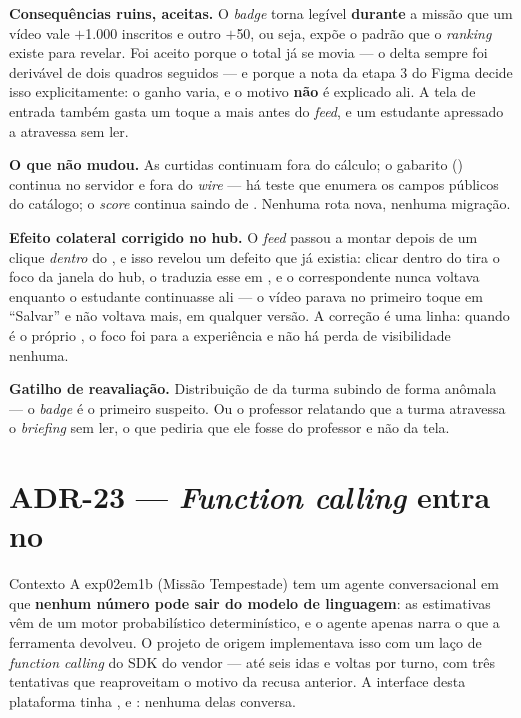 \textbf{Consequências ruins, aceitas.} O \emph{badge} torna legível
\textbf{durante} a missão que um vídeo vale $+$1.000 inscritos e outro $+$50, ou
seja, expõe o padrão que o \emph{ranking} existe para revelar. Foi aceito porque
o total já se movia --- o delta sempre foi derivável de dois quadros seguidos ---
e porque a nota da etapa 3 do Figma decide isso explicitamente: o ganho varia, e
o motivo \textbf{não} é explicado ali. A tela de entrada também gasta um toque a
mais antes do \emph{feed}, e um estudante apressado a atravessa sem ler.

\textbf{O que não mudou.} As curtidas continuam fora do cálculo; o gabarito
() continua no servidor e fora do \emph{wire} --- há teste que
enumera os campos públicos do catálogo; o \emph{score} continua saindo de
. Nenhuma rota nova, nenhuma migração.

\textbf{Efeito colateral corrigido no hub.} O \emph{feed} passou a montar depois
de um clique \emph{dentro} do , e isso revelou um defeito que já
existia: clicar dentro do  tira o foco da janela do hub, o
 traduzia esse  em , e o 
correspondente nunca voltava enquanto o estudante continuasse ali --- o vídeo parava
no primeiro toque em \enquote{Salvar} e não voltava mais, em qualquer versão. A
correção é uma linha: quando  é o próprio
, o foco foi para a experiência e não há perda de visibilidade
nenhuma.

\textbf{Gatilho de reavaliação.} Distribuição de  da turma
subindo de forma anômala --- o \emph{badge} é o primeiro suspeito. Ou o professor
relatando que a turma atravessa o \emph{briefing} sem ler, o que pediria que ele
fosse do professor e não da tela.

\section{ADR-23 --- \emph{Function calling} entra no }
\label{adr:ferramentas}

\begin{especificacao}{Contexto}
A exp02em1b (Missão Tempestade) tem um agente conversacional em que \textbf{nenhum
número pode sair do modelo de linguagem}: as estimativas vêm de um motor
probabilístico determinístico, e o agente apenas narra o que a ferramenta
devolveu. O projeto de origem implementava isso com um laço de \emph{function
calling} do SDK do vendor --- até seis idas e voltas por turno, com três
tentativas que reaproveitam o motivo da recusa anterior. A interface
 desta plataforma tinha ,  e
: nenhuma delas conversa.
\end{especificacao}


